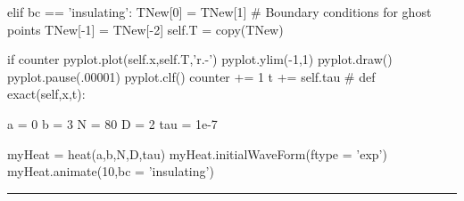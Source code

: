 \begin{codeexample}
\begin{VerbatimOut}{\listingFile}
            elif bc == 'insulating':
                TNew[0] =  TNew[1] # Boundary conditions for ghost points
                TNew[-1] =  TNew[-2]
            self.T = copy(TNew)

            if counter %
                pyplot.plot(self.x,self.T,'r.-')
                pyplot.ylim(-1,1)
                pyplot.draw()
                pyplot.pause(.00001)
                pyplot.clf()
            counter += 1
            t += self.tau
            #    def exact(self,x,t):
        


a = 0 
b = 3
N = 80
D = 2
tau = 1e-7


myHeat = heat(a,b,N,D,tau)
myHeat.initialWaveForm(ftype = 'exp')
myHeat.animate(10,bc = 'insulating')
\end{VerbatimOut}
\end{codeexample}
\else
\noindent\rule{5 in}{0.01 in}
\fi
